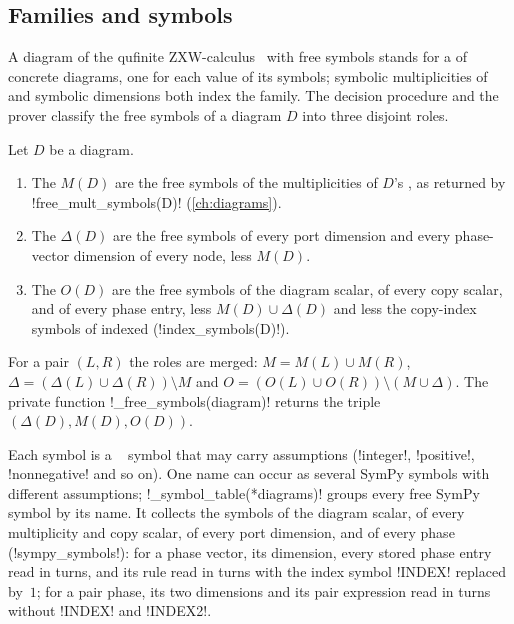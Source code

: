 \subsection{Families and symbols}

A diagram of the qufinite ZXW-calculus~\cite{poor2023zxw,wang2023qufinitezxw} with free symbols stands for a  of concrete diagrams, one for each value of its symbols; symbolic multiplicities of \bboxes{}~\cite{dixon2009graphical,kissinger2014pattern} and symbolic dimensions both index the family. The decision procedure and the prover classify the free symbols of a diagram $D$ into three disjoint roles.

\begin{definition}\label{def:proofs-roles}
Let $D$ be a diagram.
\begin{enumerate}
\item The  $M(D)$ are the free symbols of the multiplicities of $D$'s \bboxes{}, as returned by \py!free_mult_symbols(D)! (\cref{ch:diagrams}).
\item The  $\Delta(D)$ are the free symbols of every port dimension and every phase-vector dimension of every node, less $M(D)$.
\item The  $O(D)$ are the free symbols of the diagram scalar, of every \bbox{} copy scalar, and of every phase entry, less $M(D)\cup\Delta(D)$ and less the copy-index symbols of indexed \bboxes{} (\py!index_symbols(D)!).
\end{enumerate}
For a pair $(L,R)$ the roles are merged: $M=M(L)\cup M(R)$, $\Delta=(\Delta(L)\cup\Delta(R))\setminus M$ and $O=(O(L)\cup O(R))\setminus(M\cup\Delta)$. The private function \py!_free_symbols(diagram)! returns the triple $(\Delta(D),M(D),O(D))$.
\end{definition}

Each symbol is a ~\cite{meurer2017sympy} symbol that may carry assumptions (\code!integer!, \code!positive!, \code!nonnegative! and so on). One name can occur as several SymPy symbols with different assumptions; \py!_symbol_table(*diagrams)! groups every free SymPy symbol by its name. It collects the symbols of the diagram scalar, of every \bbox{} multiplicity and copy scalar, of every port dimension, and of every phase (\py!sympy_symbols!): for a phase vector, its dimension, every stored phase entry read in turns, and its rule read in turns with the index symbol \py!INDEX! replaced by~$1$; for a pair phase, its two dimensions and its pair expression read in turns without \py!INDEX! and \py!INDEX2!.

